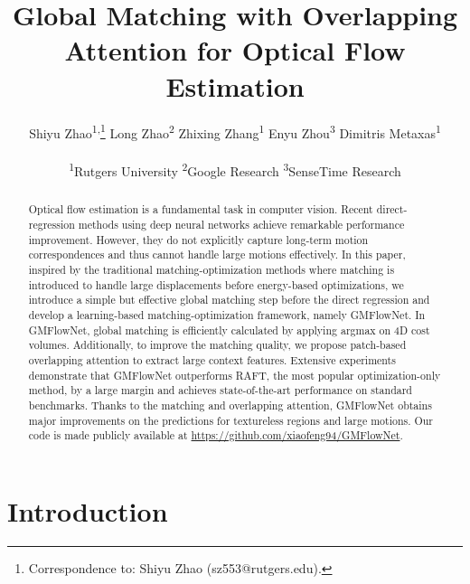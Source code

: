 \documentclass[10pt,twocolumn,letterpaper]{article}
\begin{document}
\title{Global Matching with Overlapping Attention for Optical Flow Estimation}



\author{Shiyu Zhao\textsuperscript{1,}\thanks{Correspondence
to: Shiyu Zhao (sz553@rutgers.edu).} \qquad 
Long Zhao\textsuperscript{2}  \qquad 
Zhixing Zhang\textsuperscript{1}  \qquad 
Enyu Zhou\textsuperscript{3} \qquad 
Dimitris Metaxas\textsuperscript{1}\\
\\
\textsuperscript{1}Rutgers University \qquad
\textsuperscript{2}Google Research\qquad
\textsuperscript{3}SenseTime Research\\
}

\maketitle

\begin{abstract}
   Optical flow estimation is a fundamental task in computer vision. Recent direct-regression methods using deep neural networks achieve remarkable performance improvement. However, they do not explicitly capture long-term motion correspondences and thus cannot handle large motions effectively.
   In this paper, inspired by the traditional matching-optimization methods where matching is introduced to handle large displacements before energy-based optimizations, we introduce a simple but effective global matching step before the direct regression and develop a learning-based matching-optimization framework, namely GMFlowNet. 
   In GMFlowNet, global matching is efficiently calculated by applying argmax on 4D cost volumes. 
   Additionally, to improve the matching quality, we propose patch-based overlapping attention to extract large context features. 
   Extensive experiments demonstrate that GMFlowNet outperforms RAFT, the most popular optimization-only method, by a large margin and achieves state-of-the-art performance on standard benchmarks. Thanks to the matching and overlapping attention, GMFlowNet obtains major improvements on the predictions for textureless regions and large motions. Our code is made publicly available at \url{https://github.com/xiaofeng94/GMFlowNet}.
\end{abstract}

\section{Introduction}
\label{sec:intro}
\end{document}
